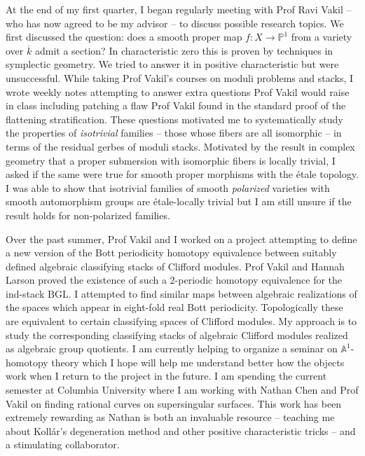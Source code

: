 \documentclass[11pt]{article}
\newcommand{\etale}{\'{e}tale\xspace}
\newcommand{\A}{\mathbb{A}}
\renewcommand{\P}{\mathbb{P}}
\begin{document}
\par
At the end of my first quarter, I began regularly meeting with Prof Ravi Vakil -- who has now agreed to be my advisor -- to discuss possible research topics. We first discussed the question: does a smooth proper map $f : X \to \P^1$ from a variety over $\overline{k}$ admit a section? In characteristic zero this is proven by techniques in symplectic geometry. We tried to answer it in positive characteristic but were unsuccessful. While taking Prof Vakil's courses on moduli problems and stacks, I wrote weekly notes attempting to answer extra questions Prof Vakil would raise in class including patching a flaw Prof Vakil found in the standard proof of the flattening stratification. These questions motivated me to systematically study the properties of \textit{isotrivial} families -- those whose fibers are all isomorphic -- in terms of the residual gerbes of moduli stacks. Motivated by the result in complex geometry that a proper submersion with isomorphic fibers is locally trivial, I asked if the same were true for smooth proper morphisms with the \etale topology. I was able to show that isotrivial families of smooth \textit{polarized} varieties with smooth automorphism groups are \etale-locally trivial but I am still unsure if the result holds for non-polarized families. 
\par 
Over the past summer, Prof Vakil and I worked on a project attempting to define a new version of the Bott periodicity homotopy equivalence between suitably defined algebraic classifying stacks of Clifford modules. Prof Vakil and Hannah Larson proved the existence of such a $2$-periodic homotopy equivalence for the ind-stack $\mathrm{BGL}$. I attempted to find similar maps between algebraic realizations of the spaces which appear in eight-fold real Bott periodicity. Topologically these are equivalent to certain classifying spaces of Clifford modules. My approach is to study the corresponding classifying stacks of algebraic Clifford modules realized as algebraic group quotients. I am currently helping to organize a seminar on $\A^1$-homotopy theory which I hope will help me understand better how the objects work when I return to the project in the future. I am spending the current semester at Columbia University where I am working with Nathan Chen and Prof Vakil on finding rational curves on supersingular surfaces. This work has been extremely rewarding as Nathan is both an invaluable resource -- teaching me about Koll\'{a}r's degeneration method and other positive characteristic tricks -- and a stimulating collaborator. 
\end{document}
